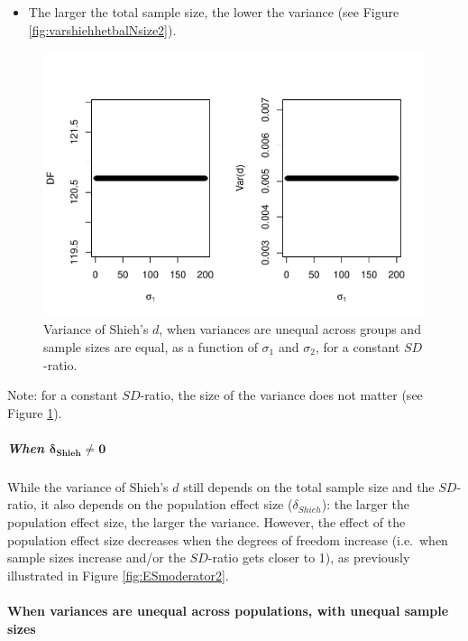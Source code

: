 \documentclass[
  english,
  man,mask]{apa6}
\providecommand{\tightlist}{%
  \setlength{\itemsep}{0pt}\setlength{\parskip}{0pt}}
\let\oldparagraph\paragraph
\renewcommand{\paragraph}[1]{\oldparagraph{#1}\mbox{}}
\let\oldsubparagraph\subparagraph
\renewcommand{\subparagraph}[1]{\oldsubparagraph{#1}\mbox{}}
\begin{document}
\begin{itemize}
\tightlist
\item
  The larger the total sample size, the lower the variance (see Figure \ref{fig:varshiehhetbalNsize2}).
\end{itemize}

\begin{figure}
\centering
\includegraphics{SupMat1_files/figure-latex/varshiehhetbalvariance2-1.pdf}
\caption{\label{fig:varshiehhetbalvariance2}Variance of Shieh's \(d\), when variances are unequal across groups and sample sizes are equal, as a function of \(\sigma_1\) and \(\sigma_2\), for a constant \(SD\)-ratio.}
\end{figure}

Note: for a constant \(SD\)-ratio, the size of the variance does not matter (see Figure \ref{fig:varshiehhetbalvariance2}).

\hypertarget{when-bmdelta_shieh-neq-0-1}{%
\subparagraph{\texorpdfstring{When \(\bm{\delta_{Shieh} \neq 0}\)}{When \textbackslash bm\{\textbackslash delta\_\{Shieh\} \textbackslash neq 0\}}}\label{when-bmdelta_shieh-neq-0-1}}

While the variance of Shieh's \(d\) still depends on the total sample size and the \(SD\)-ratio, it also depends on the population effect size (\(\delta_{Shieh}\)): the larger the population effect size, the larger the variance. However, the effect of the population effect size decreases when the degrees of freedom increase (i.e.~when sample sizes increase and/or the \(SD\)-ratio gets closer to 1), as previously illustrated in Figure \ref{fig:ESmoderator2}.

\hypertarget{when-variances-are-unequal-across-populations-with-unequal-sample-sizes-4}{%
\paragraph{When variances are unequal across populations, with unequal sample sizes}\label{when-variances-are-unequal-across-populations-with-unequal-sample-sizes-4}}
\end{document}

